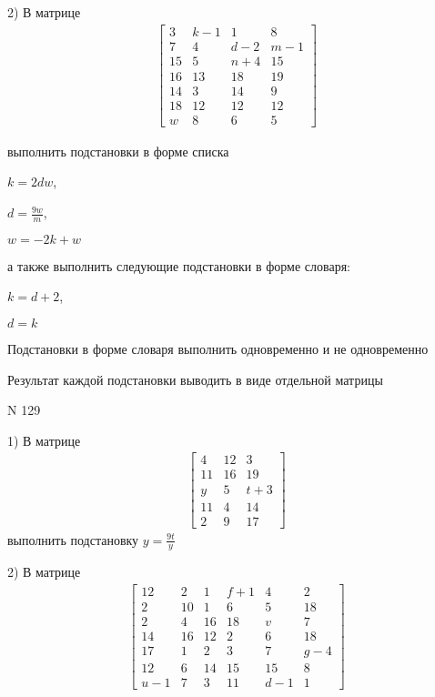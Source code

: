 \documentclass[11pt]{report}
\begin{document}
    2) В матрице
\begin{align*}
\left[\begin{matrix}3 & k - 1 & 1 & 8\\7 & 4 & d - 2 & m - 1\\15 & 5 & n + 4 & 15\\16 & 13 & 18 & 19\\14 & 3 & 14 & 9\\18 & 12 & 12 & 12\\w & 8 & 6 & 5\end{matrix}\right]
\end{align*}

выполнить подстановки в форме списка

$k=2 d w$,

$d=\frac{9 w}{m}$,

$w=- 2 k + w$

а также выполнить следующие подстановки в форме словаря:

$k=d + 2$,

$d=k$


    Подстановки в форме словаря выполнить одновременно и не одновременно


    Результат каждой подстановки выводить в виде отдельной матрицы

\newpage
N 129


    1) В матрице
\begin{align*}
\left[\begin{matrix}4 & 12 & 3\\11 & 16 & 19\\y & 5 & t + 3\\11 & 4 & 14\\2 & 9 & 17\end{matrix}\right]
\end{align*}
выполнить подстановку $y=\frac{9 t}{y}$


    2) В матрице
\begin{align*}
\left[\begin{matrix}12 & 2 & 1 & f + 1 & 4 & 2\\2 & 10 & 1 & 6 & 5 & 18\\2 & 4 & 16 & 18 & v & 7\\14 & 16 & 12 & 2 & 6 & 18\\17 & 1 & 2 & 3 & 7 & g - 4\\12 & 6 & 14 & 15 & 15 & 8\\u - 1 & 7 & 3 & 11 & d - 1 & 1\end{matrix}\right]
\end{align*}
\end{document}
